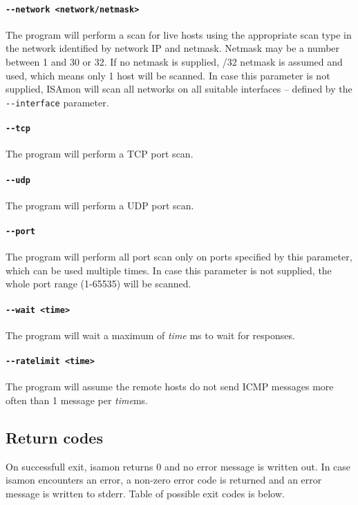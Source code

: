\documentclass[11pt,a4paper]{article}
\begin{document}
		\paragraph{\texttt{-{}-network <network/netmask>}} The program will perform a scan for live hosts using the appropriate scan type in the network identified by network IP and netmask. Netmask may be a number between 1 and 30 or 32. If no netmask is supplied, /32 netmask is assumed and used, which means only 1 host will be scanned. In case this parameter is not supplied, ISAmon will scan all networks on all suitable interfaces -- defined by the \texttt{-{}-interface} parameter.
		\vspace{-0.5cm}
		\paragraph{\texttt{-{}-tcp}} The program will perform a TCP port scan.
		\vspace{-0.5cm}
		\paragraph{\texttt{-{}-udp}} The program will perform a UDP port scan.
		\vspace{-0.5cm}
		\paragraph{\texttt{-{}-port}} The program will perform all port scan only on ports specified by this parameter, which can be used multiple times. In case this parameter is not supplied, the whole port range (1-65535) will be scanned.
		\vspace{-0.5cm}
		\paragraph{\texttt{-{}-wait <time>}} The program will wait a maximum of \emph{time} ms to wait for responses.
		\vspace{-0.5cm}
		\paragraph{\texttt{-{}-ratelimit <time>}} The program will assume the remote hosts do not send ICMP messages more often than 1 message per \emph{time}ms.
		
	\subsection{Return codes}
		On successfull exit, isamon returns 0 and no error message is written out.
		In case isamon encounters an error, a non-zero error code is returned and an error message is written to stderr. Table of possible exit codes is below.\\\\
		
\end{document}
